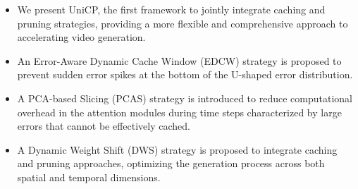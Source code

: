 \begin{itemize}
    \item We present UniCP, the first framework to jointly integrate caching and pruning strategies, providing a more flexible and comprehensive approach to accelerating video generation.

    \item An Error-Aware Dynamic Cache Window (EDCW) strategy is proposed to prevent sudden error spikes at the bottom of the U-shaped error distribution.

    \item A PCA-based Slicing (PCAS) strategy is introduced to reduce computational overhead in the attention modules during time steps characterized by large errors that cannot be effectively cached.

    \item A Dynamic Weight Shift (DWS) strategy is proposed to integrate caching and pruning approaches, optimizing the generation process across both spatial and temporal dimensions.
\end{itemize}


